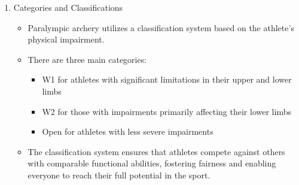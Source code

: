 \begin{enumerate}
\item Categories and Classifications
    \begin{itemize}
    \item Paralympic archery utilizes a classification system based on the athlete's physical impairment. 
    \item There are three main categories: 
        \begin{itemize}
        \item W1 for athletes with significant limitations in their upper and lower limbs
        \item W2 for those with impairments primarily affecting their lower limbs
        \item Open for athletes with less severe impairments
        \end{itemize}
    \item The classification system ensures that athletes compete against others with comparable functional abilities, fostering fairness and enabling everyone to reach their full potential in the sport.
    \end{itemize}

\end{enumerate}